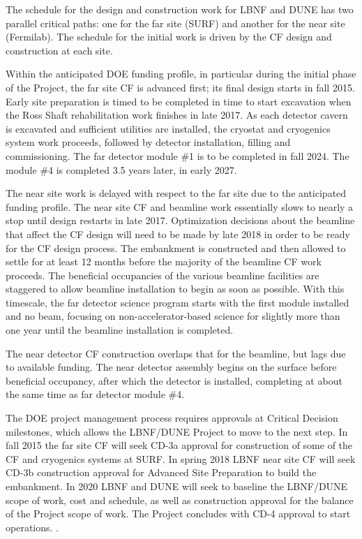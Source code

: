 The schedule for the design and construction work for LBNF and DUNE has two parallel critical paths: one for the %
far site (SURF) and %
another for the %
near site (Fermilab). The schedule for the initial work is driven by the CF design and construction at each site. 

Within the anticipated DOE funding profile, in particular during the initial phase of the Project, the far site CF is advanced first; its final design starts in fall 2015. Early site preparation is timed to be completed %
in time to start excavation when the Ross Shaft rehabilitation work finishes %
 in late 2017. As each detector %
 cavern is excavated and sufficient utilities are installed, the cryostat and cryogenics system work proceeds, followed by detector installation, filling and commissioning. The far detector module \#1 is to be completed in fall 2024. The module \#4 is completed 3.5 years later, in early 2027. 

The near site work is delayed with respect to the far site due to the anticipated funding profile. The near site CF and beamline work essentially slows to nearly a stop %
until design restarts in late 2017. Optimization decisions about the beamline that affect the CF design will need to be made by late 2018 in order to be ready for the CF design process. The embankment is constructed and then allowed to settle for at least 12 months before the majority of the beamline CF work proceeds. The beneficial occupancies of the various beamline facilities %
are staggered to allow beamline installation to begin as soon as possible. With this timescale, the far detector science program %
starts with the first module installed and no beam, focusing on non-accelerator-based science %
for slightly more than one year until 
the beamline installation is completed.


The near detector CF construction overlaps that for the beamline, but lags due to available funding. The near detector assembly begins on the surface before beneficial occupancy, after which the detector is installed, completing at about the same time as far detector module \#4. 

The DOE project management process requires approvals at Critical Decision milestones, which allows the LBNF/DUNE Project to move to the next step. In fall 2015 the far site CF will seek CD-3a approval for construction of some of the CF and cryogenics systems at SURF. In spring 2018 LBNF near site CF will seek CD-3b construction approval for Advanced Site Preparation to build the embankment. In 2020 LBNF and DUNE will seek to baseline the LBNF/DUNE scope of work, cost and schedule, as well as construction approval for the balance of the Project scope of work. %
The Project concludes with CD-4 approval to start operations.
. 


